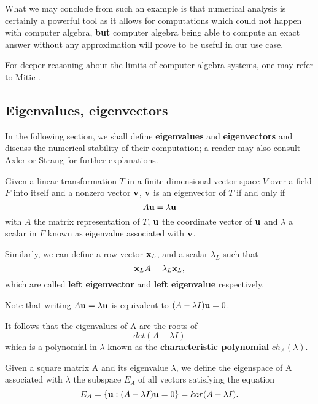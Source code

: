 What we may conclude from such an example is that numerical analysis is certainly a powerful tool as it allows for computations
which could not happen with computer algebra, \textbf{but} computer algebra being able to compute an exact answer without
any approximation will prove to be useful in our use case.

For deeper reasoning about the limits of computer algebra systems, one may refer to Mitic \cite{mitic}.

\subsection*{Eigenvalues, eigenvectors}
In the following section, we shall define \textbf{eigenvalues} and \textbf{eigenvectors} and discuss the numerical stability
of their computation; a reader may also consult Axler \cite{axler} or Strang \cite{strang09} for further explanations.

\begin{definition}
    Given a linear transformation \(T\) in a finite-dimensional vector space \(V\) over a field \(F\) into itself and a nonzero
    vector
    \(\vb{v}\), \(\vb{v}\) is an eigenvector of \(T\) if and only if
    \[ A \vb{u} = \lambda \vb{u} \]
    with \(A\) the matrix representation of \(T\), \(\vb{u}\) the coordinate vector of \(\vb{u}\) and \(\lambda\) a scalar in
    \(F\) known as eigenvalue associated with \(\vb{v}\).

    Similarly, we can define a row vector \(\vb{x}_{L}\), and a scalar \(\lambda_{L}\) such that
    \[\vb{x}_{L}A = \lambda_{L}\vb{x}_{L},\]
    which are called \textbf{left eigenvector} and \textbf{left eigenvalue} respectively.
\end{definition}

\begin{remark}
    Note that writing
    \( A \vb{u} = \lambda \vb{u} \) is equivalent to \( (A - \lambda I)\vb{u} = 0 \).

    It follows that the eigenvalues of A are the roots of
    \[ det(A - \lambda I) \]
    which is a polynomial in \(\lambda\) known as the \textbf{characteristic polynomial} \(ch_{A}(\lambda)\).
\end{remark}

\begin{definition}[Eigenspace]
    Given a square matrix A and its eigenvalue \(\lambda\), we define the eigenspace of A associated with \(\lambda\) the subspace
    \(E_{A}\) of all vectors satisfying the equation
    \[E_{A} = \{\vb{u}: (A - \lambda I)\vb{u} = 0\} = ker(A - \lambda I).\]
\end{definition}

